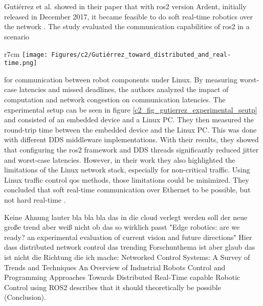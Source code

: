 \chapter{}
\label{sec:state_of_the_art}
Gutiérrez et al. showed in their paper that with \gls{ros2} version Ardent, initially released in December 2017, it became feasible to do soft real-time robotics over the network \cite{gutierrez_towards_2018}. The study evaluated the communication capabilities of \gls{ros2} in a scenario
\begin{wrapfigure}{r}{7cm}
\texttt{[image: Figures/c2/Gutiérrez\_toward\_distributed\_and\_real-time.png]}
\caption{The experimental setup used by Gutiérrez et al. to evaluate the real-time performance of \gls{ros2} communication over Ethernet. Figure taken from \cite{gutierrez_towards_2018}.} \label{c2_fig_gutierrez_experimental_seutp}
\end{wrapfigure}
for communication between robot components under Linux. By measuring worst-case latencies and missed deadlines, the authors analyzed the impact of computation and network congestion on communication latencies. The experimental setup can be seen in figure \ref{c2_fig_gutierrez_experimental_seutp} and consisted of an embedded device and a Linux PC. They then measured the round-trip time between the embedded device and the Linux PC. This was done with different DDS middleware implementations. With their results, they showed that configuring the \gls{ros2} framework and DDS threads significantly reduced jitter and worst-case latencies. However, in their work they also highlighted the limitations of the Linux network stack, especially for non-critical traffic. Using Linux traffic control \gls{qos} methods, those limitations could be minimized. They concluded that soft real-time communication over Ethernet to be possible, but not hard real-time \cite{gutierrez_towards_2018}. \newline

Keine Ahnung lauter bla bla bla das in die cloud verlegt werden soll der neue große trend aber weiß nicht ob das so wirklich passt "Edge robotics: are we ready? an experimental evaluation of current vision and future directions" \cite{groshev_edge_2023} \newline
Hier dass distributed network control das trending Forschunthema ist aber glaub das ist nicht die Richtung die ich mache: Networked Control Systems: A Survey of Trends and Techniques \cite{zhang_networked_2020} \newline
An Overview of Industrial Robots Control and Programming Approaches
Towards Distributed Real-Time capable Robotic Control using ROS2 describes that it should theoretically be possible (Conclusion).

